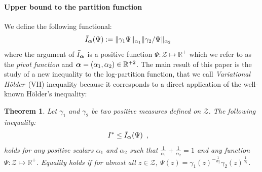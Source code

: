 \documentclass[reqno,oneside,letterpaper,10pt]{article}
\newcommand{\Holder}{H\"older\xspace}
\newcommand{\Zspace}{\mathcal{Z}}
\newcommand{\LSE}[3]{\bar{\mathbb{E}}_{#1}^{#2}\left[#3\right]}
\newcommand{\Expectation}[2]{\int{#2}d\nu(\Z)}
\def\X{X}
\def\Z{Z}
\def\z{z}
\renewcommand{\Re}{\mathbb{R}}
\newtheorem{theorem}{Theorem}
\begin{document}
\paragraph{Upper bound to the partition function}
We define the following functional:
\begin{eqnarray}
\label{eq:VH}
\bar I_{\bm{\alpha}}(\Psi)&:=
		\|\gamma_1\Psi\|_{\alpha_1}\|\gamma_2/\Psi\|_{\alpha_2}
\end{eqnarray}
where the argument of $\bar I_{\bm{\alpha}}$ is a positive function $\Psi:\Zspace\mapsto \Re^+$ %
which we refer to as the \emph{pivot function}
and $\balpha=(\alpha_1,\alpha_2)\in\Re^{+2}$. 
The main result of this paper is the study of a new inequality to the log-partition function, that we call \emph{Variational \Holder}~(VH) inequality because it
corresponds to a direct application of the well-known \Holder's inequality:
\begin{theorem}
\label{th:VH}
Let $\gamma_1$ and $\gamma_2$ be two positive measures defined on $\Zspace$. 
The following inequality:
\begin{align}
\label{eq:VH-logspace}
&I^* \le \bar I_{\bm{\alpha}}(\Psi)
\enspace,
\end{align}
holds for any positive scalars $\alpha_1$ and $\alpha_2$ such that $\frac{1}{\alpha_1} + \frac{1}{\alpha_2}=1$ and any function $\Psi:\Zspace\mapsto \Re^+$.
Equality holds if for almost all $\z\in\Zspace$, 
$\Psi(\z) = \gamma_1(\z)^{-\frac {1}{\alpha_2}}  \gamma_2(\z)^{\frac{1} {\alpha_1}}$.
\end{theorem}
\end{document}
